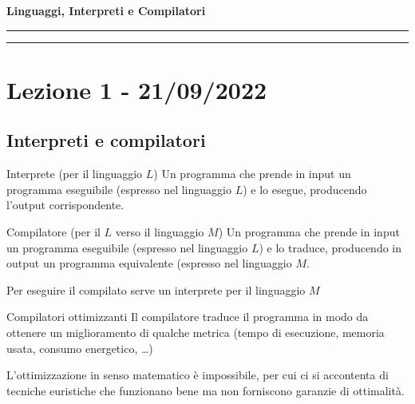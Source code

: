 \documentclass[11pt]{article}
\begin{document}
\begin{center}
    \LARGE \textbf{Linguaggi, Interpreti e Compilatori}
\end{center}

\vspace{0.5cm}
\hrule
\vspace{0.5cm}

\tableofcontents

\vspace{0.5cm}
\hrule
\vspace{0.5cm}

\section{Lezione 1 - 21/09/2022}

\subsection{Interpreti e compilatori}
    \begin{definition}{Interprete (per il linguaggio $L$)}
        Un programma che prende in input un programma eseguibile (espresso nel linguaggio $L$) e lo esegue, producendo l'output corrispondente.
    \end{definition}

    \begin{definition}{Compilatore (per il $L$ verso il linguaggio $M$)}
        Un programma che prende in input un programma eseguibile (espresso nel linguaggio $L$) e lo traduce, producendo in output un programma equivalente (espresso nel linguaggio $M$.
    \end{definition}

    \begin{note}{}{}
        Per eseguire il compilato serve un interprete per il linguaggio $M$
    \end{note}

    \begin{definition}{Compilatori ottimizzanti}
        Il compilatore traduce il programma in modo da ottenere un miglioramento di qualche metrica (tempo di esecuzione, memoria usata, consumo energetico, \dots)
    \end{definition}
    
    \begin{note}{}{}
        L'ottimizzazione in senso matematico è impossibile, per cui ci si accontenta di tecniche euristiche che funzionano bene ma non forniscono garanzie di ottimalità.
    \end{note}
    
\end{document}
